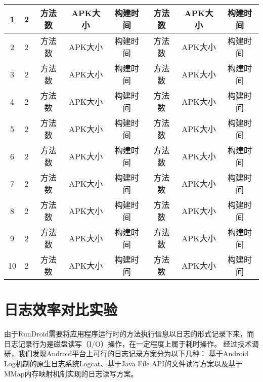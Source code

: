 {\begin{table*}[!ht]
{\begin{threeparttable}[b]
\begin{tabular}{|c|c|c|c|c|c|c|c|}
				1&	2   &方法数 & APK大小 &	构建时间 & 方法数 & APK大小 & 构建时间\\
				\hline
				2&	2   &方法数 & APK大小 &	构建时间 & 方法数 & APK大小 & 构建时间\\
				\hline
				3&	2    &方法数 & APK大小 &	构建时间 & 方法数 & APK大小 & 构建时间\\
				\hline
				4&	2    &方法数 & APK大小 &	构建时间 & 方法数 & APK大小 & 构建时间\\
				\hline
				5&	2    &方法数 & APK大小 &	构建时间 & 方法数 & APK大小 & 构建时间\\
				\hline		
				6&	2    &方法数 & APK大小 &	构建时间 & 方法数 & APK大小 & 构建时间\\
				\hline			
				7&	2    &方法数 & APK大小 &	构建时间 & 方法数 & APK大小 & 构建时间\\
				\hline		
				8&	2   &方法数 & APK大小 &	构建时间 & 方法数 & APK大小 & 构建时间\\
				\hline	
				9&	2   &方法数 & APK大小 &	构建时间 & 方法数 & APK大小 & 构建时间\\
				\hline	
				10&	2   &方法数 & APK大小 &	构建时间 & 方法数 & APK大小 & 构建时间\\
				\hline
				
				
				
			\end{tabular}
			
			
		\end{threeparttable}
	}
\end{table*}


}
\section{日志效率对比实验}

由于RunDroid需要将应用程序运行时的方法执行信息以日志的形式记录下来，而日志记录行为是磁盘读写（I/O）操作，在一定程度上属于耗时操作。
经过技术调研，我们发现Android平台上可行的日志记录方案分为以下几种：
基于Android Log机制的原生日志系统Logcat、基于Java File API的文件读写方案以及基于MMap内存映射机制实现的日志读写方案。



